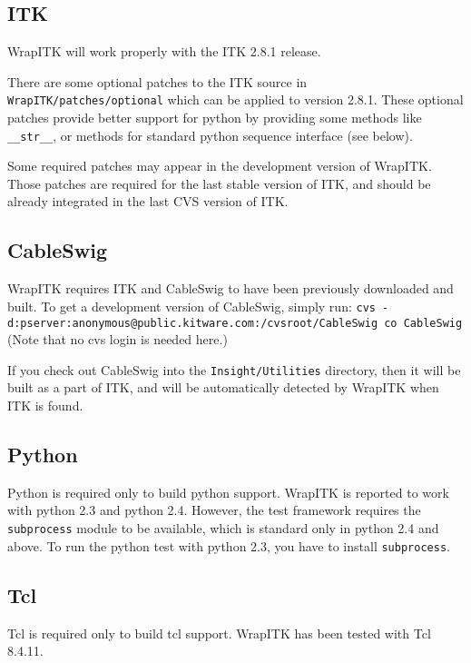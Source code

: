 \documentclass{InsightArticle}
\begin{document}
    \subsection{ITK}

WrapITK will work properly with the ITK 2.8.1 release.

There are some optional
patches to the ITK source in \verb$WrapITK/patches/optional$ which can be applied to
version 2.8.1. These optional patches provide
better support for python by providing some methods like \verb$__str__$, or methods
for standard python sequence interface (see below).

Some required patches may appear in the development version of WrapITK. Those
patches are required for the last stable version of ITK, and should be already
integrated in the last CVS version of ITK.

    \subsection{CableSwig}

WrapITK requires ITK and CableSwig \cite{ITKWebSite} to have been previously downloaded and built.
To get a development version of CableSwig, simply run:
\verb$cvs -d:pserver:anonymous@public.kitware.com:/cvsroot/CableSwig co CableSwig$
(Note that no cvs login is needed here.)

If you check out CableSwig into the \verb$Insight/Utilities$ directory, then it will be
built as a part of ITK, and will be automatically detected by WrapITK when ITK
is found.

    \subsection{Python}

Python \cite{PythonWebSite} is required only to build python support.
WrapITK is reported to work with python 2.3 and python 2.4. However, the test framework
requires the \verb$subprocess$ module to be available, which is standard only in python 2.4 and above.
To run the python test with python 2.3, you have to install \verb$subprocess$.

    \subsection{Tcl}

Tcl \cite{TclWebSite} is required only to build tcl support.
WrapITK has been tested with Tcl 8.4.11.
\end{document}
